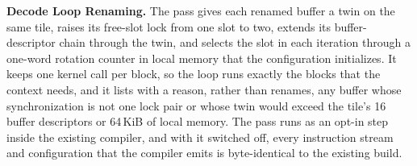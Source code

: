 \textbf{Decode Loop Renaming.}
The pass gives each renamed buffer a twin on the same tile, raises its free-slot lock from one slot to two, extends its buffer-descriptor chain through the twin, and selects the slot in each iteration through a one-word rotation counter in local memory that the configuration initializes.
It keeps one kernel call per block, so the loop runs exactly the blocks that the context needs, and it lists with a reason, rather than renames, any buffer whose synchronization is not one lock pair or whose twin would exceed the tile's 16 buffer descriptors or 64\,KiB of local memory.
The pass runs as an opt-in step inside the existing compiler, and with it switched off, every instruction stream and configuration that the compiler emits is byte-identical to the existing build.
